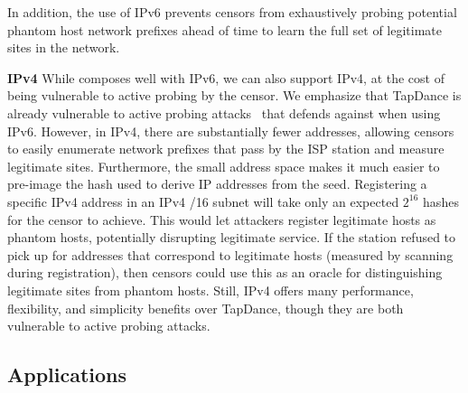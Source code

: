 \documentclass[letterpaper,twocolumn,10pt]{article}
\newcommand{\note}[2]{\hl{[\textbf{#1:} #2]}\xspace}
\newcommand{\nikita}[1]{\note{nikita}{#1}}
\renewcommand{\paragraph}[1]{\smallskip\noindent\textbf{#1\quad}}
\begin{document}
In addition, the use of IPv6 prevents censors from exhaustively probing
potential phantom host network prefixes ahead of time to learn the full set of
legitimate sites in the network.

\paragraph{IPv4}
While \scheme composes well with IPv6, we can also support IPv4,
at the cost of being vulnerable to active probing by the censor.
We emphasize that TapDance is already
vulnerable to active probing attacks~\cite{tapdance14} that \scheme defends
against when using IPv6. However, in IPv4, there are substantially fewer
addresses, allowing censors to easily enumerate network prefixes that pass by
the ISP station and measure legitimate sites. Furthermore, the small address
space makes it much easier to pre-image the hash used to derive IP addresses
from the seed. Registering a specific IPv4 address in an IPv4 /16 subnet will
take only an expected $2^{16}$ hashes for the censor to achieve. This would let
attackers register legitimate hosts as phantom hosts, potentially disrupting
legitimate service. If the station refused to pick up for addresses that
correspond to legitimate hosts (measured by scanning during registration), then
censors could use this as an oracle for distinguishing legitimate sites from
phantom hosts. Still, IPv4 \scheme offers many performance, flexibility, and
simplicity benefits over TapDance, though they are both vulnerable to active
probing attacks.




\subsection{Applications}
\end{document}
